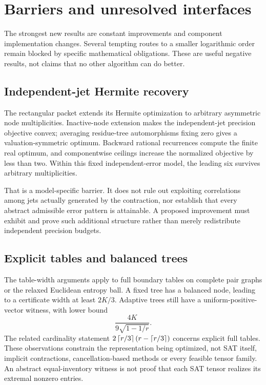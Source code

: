 \documentclass[11pt,letterpaper]{article}
\theoremstyle{remark}\newtheorem{remark}[theorem]{Remark}
\begin{document}
\section{Barriers and unresolved interfaces}
\label{sec:barriers}
The strongest new results are constant improvements and component implementation changes. Several tempting routes to a smaller logarithmic order remain blocked by specific mathematical obligations. These are useful negative results, not claims that no other algorithm can do better.

\subsection{Independent-jet Hermite recovery}
The rectangular packet extends its Hermite optimization to arbitrary asymmetric node multiplicities. Inactive-node extension makes the independent-jet precision objective convex; averaging residue-tree automorphisms fixing zero gives a valuation-symmetric optimum. Backward rational recurrences compute the finite real optimum, and componentwise ceilings increase the normalized objective by less than two. Within this fixed independent-error model, the leading six survives arbitrary multiplicities.

That is a model-specific barrier. It does not rule out exploiting correlations among jets actually generated by the contraction, nor establish that every abstract admissible error pattern is attainable. A proposed improvement must exhibit and prove such additional structure rather than merely redistribute independent precision budgets.

\subsection{Explicit tables and balanced trees}
The table-width arguments apply to full boundary tables on complete pair graphs or the relaxed Euclidean entropy ball. A fixed tree has a balanced node, leading to a certificate width at least $2K/3$. Adaptive trees still have a uniform-positive-vector witness, with lower bound
\[
 \frac{4K}{9\sqrt{1-1/r}}.
\]
The related cardinality statement $2\left\lceil r/3\right\rceil(r-\left\lceil r/3\right\rceil)$ concerns explicit full tables. These observations constrain the representation being optimized, not SAT itself, implicit contractions, cancellation-based methods or every feasible tensor family. An abstract equal-inventory witness is not proof that each SAT tensor realizes its extremal nonzero entries.
\end{document}
